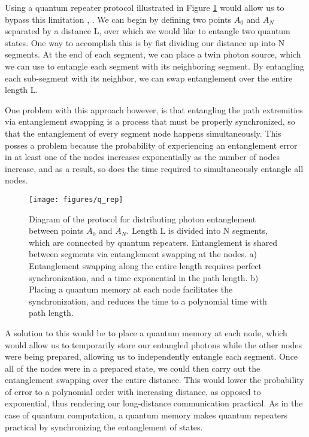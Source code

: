 Using a quantum repeater protocol illustrated in Figure \ref{fig:q_rep} would allow us to bypass this limitation \cite{Briegel98}, \cite{Duan01}.  We can begin by defining two points $A_0$ and $A_N$ separated by a distance L, over which we would like to entangle two quantum states.  One way to accomplish this is by fist dividing our distance up into N segments.  At the end of each segment, we can place a twin photon source, which we can use to entangle each segment with its neighboring segment.  By entangling each sub-segment with its neighbor, we can swap entanglement over the entire length L.

One problem with this approach however, is that entangling the path extremities via entanglement swapping is a process that must be properly synchronized, so that the entanglement of every segment node happens simultaneously.  This posses a problem because the probability of experiencing an entanglement error in at least one of the nodes increases exponentially as the number of nodes increase, and as a result, so does the time required to simultaneously entangle all nodes. 


\begin{figure}[!ht] 
 \centering 
 \texttt{[image: figures/q\_rep]} 
 \caption[Quantum repeater schematic]{Diagram of the protocol for
distributing photon entanglement between points $A_0$ and $A_N$.  Length L is
divided into N segments, which are connected by quantum repeaters.
Entanglement is shared between segments via entanglement swapping at the
nodes.  a)  Entanglement swapping along the entire length requires perfect
synchronization, and a time exponential in the path length.  b)  Placing a
quantum memory at each node facilitates the synchronization, and reduces the
time to a polynomial time with path length.} 
 \label{fig:q_rep} 
\end{figure}


A solution to this would be to place a quantum memory at each node, which would allow us to temporarily store our entangled photons while the other nodes were being prepared, allowing us to independently entangle each segment.  Once all of the nodes were in a prepared state, we could then carry out the entanglement swapping over the entire distance.  This would lower the probability of error to a polynomial order with increasing distance, as opposed to exponential, thus rendering our long-distance communication practical.  As in the case of quantum computation, a quantum memory makes quantum repeaters practical by synchronizing the entanglement of states.

